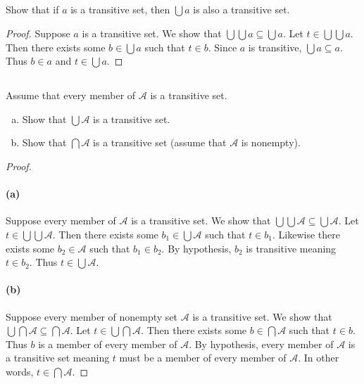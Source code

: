 \documentclass{report}
\begin{document}
\subsection{}%

Show that if $a$ is a transitive set, then $\bigcup a$ is also a transitive set.

\begin{proof}

  Suppose $a$ is a transitive set.
  We show that $\bigcup\bigcup{a} \subseteq \bigcup a$.
  Let $t \in \bigcup\bigcup{a}$.
  Then there exists some $b \in \bigcup{a}$ such that $t \in b$.
  Since $a$ is transitive, $\bigcup{a} \subseteq a$.
  Thus $b \in a$ and $t \in \bigcup a$.

\end{proof}

\subsection{}%

Assume that every member of $\mathscr{A}$ is a transitive set.

\begin{enumerate}[(a)]
  \item Show that $\bigcup\mathscr{A}$ is a transitive set.
  \item Show that $\bigcap\mathscr{A}$ is a transitive set (assume that
    $\mathscr{A}$ is nonempty).
\end{enumerate}

\begin{proof}

  \paragraph{(a)}%

    Suppose every member of $\mathscr{A}$ is a transitive set.
    We show that $\bigcup\bigcup{\mathscr{A}} \subseteq \bigcup{\mathscr{A}}$.
    Let $t \in \bigcup\bigcup{\mathscr{A}}$.
    Then there exists some $b_1 \in \bigcup{\mathscr{A}}$ such that $t \in b_1$.
    Likewise there exists some $b_2 \in \mathscr{A}$ such that $b_1 \in b_2$.
    By hypothesis, $b_2$ is transitive meaning $t \in b_2$.
    Thus $t \in \bigcup{\mathscr{A}}$.

  \paragraph{(b)}%

    Suppose every member of nonempty set $\mathscr{A}$ is a transitive set.
    We show that $\bigcup\bigcap{\mathscr{A}} \subseteq \bigcap{\mathscr{A}}$.
    Let $t \in \bigcup\bigcap{\mathscr{A}}$.
    Then there exists some $b \in \bigcap{\mathscr{A}}$ such that $t \in b$.
    Thus $b$ is a member of every member of $\mathscr{A}$.
    By hypothesis, every member of $\mathscr{A}$ is a transitive set meaning
      $t$ must be a member of every member of $\mathscr{A}$.
    In other words, $t \in \bigcap{\mathscr{A}}$.

\end{proof}
\end{document}
